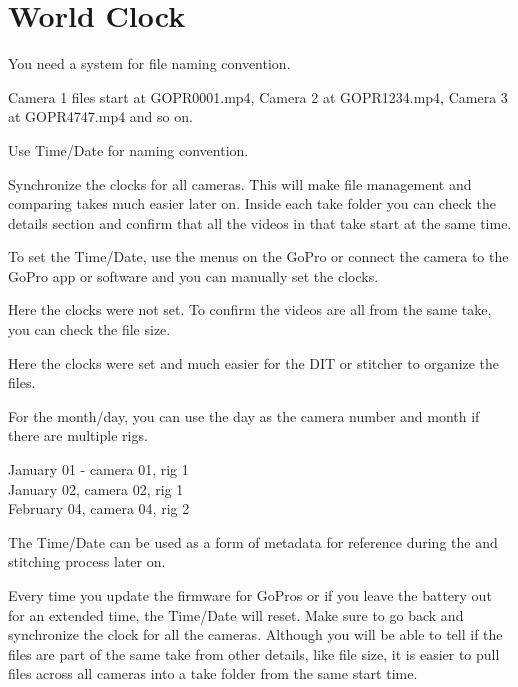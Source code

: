 \section{World Clock}
\pagecolor{white}
\label{chap:5}
\begin{fullwidth}


\problem

{\large You need a system for file naming convention. \par}

Camera 1 files start at GOPR0001.mp4, Camera 2 at GOPR1234.mp4, Camera 3 at GOPR4747.mp4 and so on. 


\solution

{\large Use Time/Date for naming convention. \par}

Synchronize the clocks for all cameras. This will make file management and comparing takes much easier later on. Inside each take folder you can check the details section and confirm that all the videos in that take start at the same time. 

To set the Time/Date, use the menus on the GoPro or connect the camera to the GoPro app or software and you can manually set the clocks.


Here the clocks were not set. To confirm the videos are all from the same take, you can check the file size. 


Here the clocks were set and much easier for the DIT or stitcher to organize the files.


For the month/day, you can use the day as the camera number and month if there are multiple rigs. 

January 01 - camera 01, rig 1
\\
January 02, camera 02, rig 1
\\
February 04, camera 04, rig 2


The Time/Date can be used as a form of metadata for reference during the \textbf{} and stitching process later on. 

\tip Every time you update the firmware for GoPros or if you leave the battery out for an extended time, the Time/Date will reset. Make sure to go back and synchronize the clock for all the cameras. Although you will be able to tell if the files are part of the same take from other details, like file size, it is easier to pull files across all cameras into a take folder from the same start time. 




\clearpage
\end{fullwidth}
